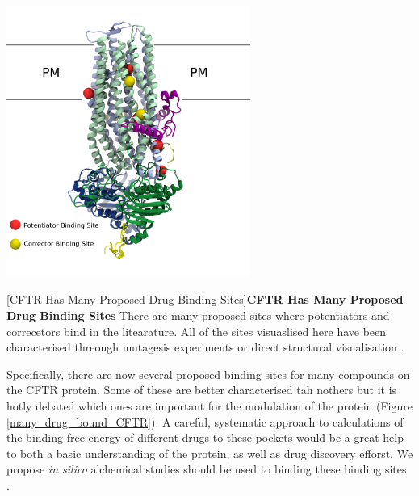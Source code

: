 \begin{center}
	\includegraphics[width=0.6\textwidth]{figures/many_drug_sites.pdf}
\end{center}
\begingroup
\captionsetup{singlelinecheck = false, justification=raggedright}
[CFTR Has Many Proposed Drug Binding Sites]{\textbf{CFTR Has Many Proposed Drug Binding Sites} {There are many proposed sites where potentiators and correcetors bind in the litearature. All of the sites visuaslised here have been characterised threough mutagesis experiments or direct structural visualisation \cite{yeh2019, laselva2021a, liu2019, baatallah2021}. }}
\endgroup


Specifically, there are now several proposed binding sites for many compounds on the CFTR protein. Some of these are better characterised tah nothers but it is hotly debated which ones are important for the modulation of the protein (Figure \ref{many_drug_bound_CFTR}). A careful, systematic approach to calculations of the binding free energy of different drugs to these pockets would be a great help to both a basic understanding of the protein, as well as drug discovery efforst. We propose \textit{in silico} alchemical studies should be used to binding these binding sites \cite{}.


